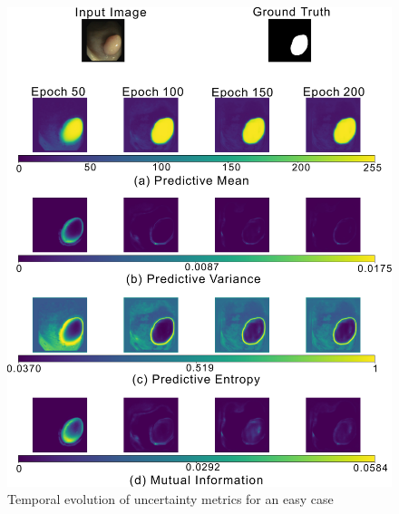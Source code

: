 \documentclass[10pt, a4paper, twocolumn]{jarticle}
\begin{document}
\begin{figure}[t] %
  \begin{center}
    \includegraphics[width=\hsize]{figure/fold5_file144_uncertainty_evolution.pdf}
    \caption{Temporal evolution of uncertainty metrics for an easy case}
    \label{fold5_file144}
  \end{center}
\end{figure}
\end{document}
